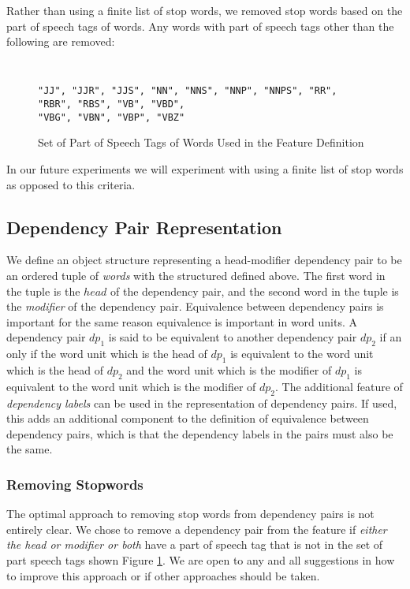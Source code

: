 \documentclass[11pt]{article}
\begin{document}
Rather than using a finite list of stop words, we removed stop words based on the part of speech tags of words. Any words with part of speech tags other than the following are removed:

\begin{figure}[H]
\begin{shaded} \tt
\begin{verbatim}
"JJ", "JJR", "JJS", "NN", "NNS", "NNP", "NNPS", "RR", "RBR", "RBS", "VB", "VBD", 
"VBG", "VBN", "VBP", "VBZ"
\end{verbatim}
\end{shaded}
\caption{Set of Part of Speech Tags of Words Used in the Feature Definition}
\label{fig:KeeperPOS}
\end{figure}

In our future experiments we will experiment with using a finite list of stop words as opposed to this criteria.

\subsection{Dependency Pair Representation}

We define an object structure representing a head-modifier dependency pair to be an ordered tuple of \emph{words} with the structured defined above. The first word in the tuple is the $head$ of the dependency pair, and the second word in the tuple is the \emph{modifier} of the dependency pair.  Equivalence between dependency pairs is important for the same reason equivalence is important in word units. A dependency pair $dp_1$ is said to be equivalent to another dependency pair $dp_2$ if an only if the word unit which is the head of $dp_1$ is equivalent to the word unit which is the head of $dp_2$ and the word unit which is the modifier of $dp_1$ is equivalent to the word unit which is the modifier of $dp_2$. The additional feature of \emph{dependency labels} can be used in the representation of dependency pairs. If used, this adds an additional component to the definition of equivalence between dependency pairs, which is that the dependency labels in the pairs must also be the same.

\subsubsection{Removing Stopwords}

The optimal approach to removing stop words from dependency pairs is not entirely clear. We chose to remove a dependency pair from the feature if \emph{either the head or modifier or both} have a part of speech tag that is not in the set of part speech tags shown Figure \ref{fig:KeeperPOS}. We are open to any and all suggestions in how to improve this approach or if other approaches should be taken. 
\end{document}
